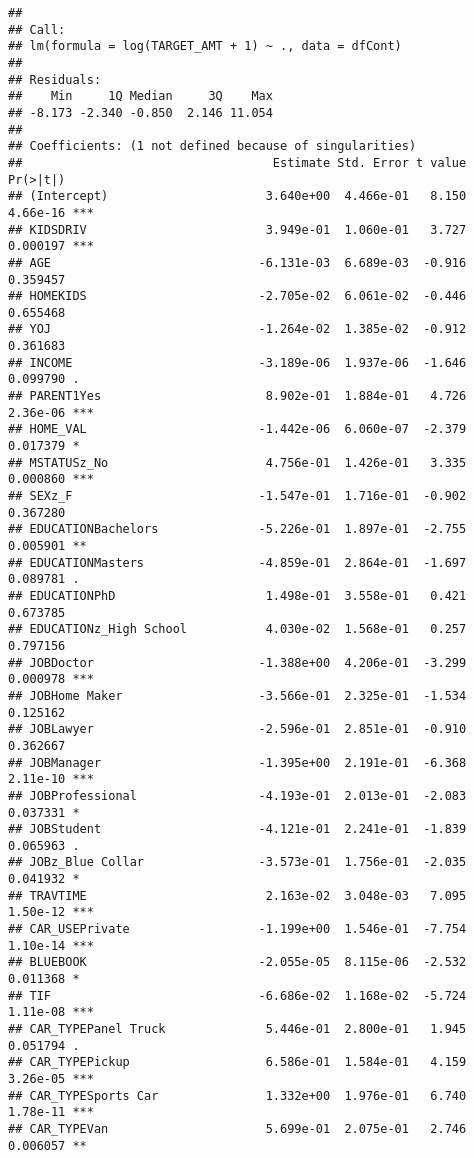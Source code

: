\documentclass[]{article}
\begin{document}
\begin{verbatim}
## 
## Call:
## lm(formula = log(TARGET_AMT + 1) ~ ., data = dfCont)
## 
## Residuals:
##    Min     1Q Median     3Q    Max 
## -8.173 -2.340 -0.850  2.146 11.054 
## 
## Coefficients: (1 not defined because of singularities)
##                                   Estimate Std. Error t value Pr(>|t|)    
## (Intercept)                      3.640e+00  4.466e-01   8.150 4.66e-16 ***
## KIDSDRIV                         3.949e-01  1.060e-01   3.727 0.000197 ***
## AGE                             -6.131e-03  6.689e-03  -0.916 0.359457    
## HOMEKIDS                        -2.705e-02  6.061e-02  -0.446 0.655468    
## YOJ                             -1.264e-02  1.385e-02  -0.912 0.361683    
## INCOME                          -3.189e-06  1.937e-06  -1.646 0.099790 .  
## PARENT1Yes                       8.902e-01  1.884e-01   4.726 2.36e-06 ***
## HOME_VAL                        -1.442e-06  6.060e-07  -2.379 0.017379 *  
## MSTATUSz_No                      4.756e-01  1.426e-01   3.335 0.000860 ***
## SEXz_F                          -1.547e-01  1.716e-01  -0.902 0.367280    
## EDUCATIONBachelors              -5.226e-01  1.897e-01  -2.755 0.005901 ** 
## EDUCATIONMasters                -4.859e-01  2.864e-01  -1.697 0.089781 .  
## EDUCATIONPhD                     1.498e-01  3.558e-01   0.421 0.673785    
## EDUCATIONz_High School           4.030e-02  1.568e-01   0.257 0.797156    
## JOBDoctor                       -1.388e+00  4.206e-01  -3.299 0.000978 ***
## JOBHome Maker                   -3.566e-01  2.325e-01  -1.534 0.125162    
## JOBLawyer                       -2.596e-01  2.851e-01  -0.910 0.362667    
## JOBManager                      -1.395e+00  2.191e-01  -6.368 2.11e-10 ***
## JOBProfessional                 -4.193e-01  2.013e-01  -2.083 0.037331 *  
## JOBStudent                      -4.121e-01  2.241e-01  -1.839 0.065963 .  
## JOBz_Blue Collar                -3.573e-01  1.756e-01  -2.035 0.041932 *  
## TRAVTIME                         2.163e-02  3.048e-03   7.095 1.50e-12 ***
## CAR_USEPrivate                  -1.199e+00  1.546e-01  -7.754 1.10e-14 ***
## BLUEBOOK                        -2.055e-05  8.115e-06  -2.532 0.011368 *  
## TIF                             -6.686e-02  1.168e-02  -5.724 1.11e-08 ***
## CAR_TYPEPanel Truck              5.446e-01  2.800e-01   1.945 0.051794 .  
## CAR_TYPEPickup                   6.586e-01  1.584e-01   4.159 3.26e-05 ***
## CAR_TYPESports Car               1.332e+00  1.976e-01   6.740 1.78e-11 ***
## CAR_TYPEVan                      5.699e-01  2.075e-01   2.746 0.006057 ** 

\end{verbatim}
\end{document}

